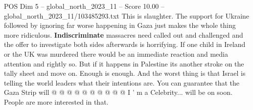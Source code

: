 \begin{textsample}{POS Dim 5 – global\_north\_2023\_11 – Score 10.00 – global\_north\_2023\_11/103485293.txt}
This is slaughter.
The support for Ukraine followed by ignoring far worse happening in Gaza just makes the whole thing more ridiculous. \textbf{Indiscriminate} massacres need called out and challenged and the offer to investigate both sides afterwards is horrifying.
If one child in Ireland or the UK was murdered there would be an immediate reaction and media attention and rightly so.
But if it happens in Palestine its another stroke on the tally sheet and move on.
Enough is enough.
And the worst thing is that Israel is telling the world leaders what their intentions are.
You can guarantee that the Gaza Strip will @ @ @ @ @ @ @ @ @ @ I ' m a Celebrity... will be on soon.
People are more interested in that.

\end{textsample}
